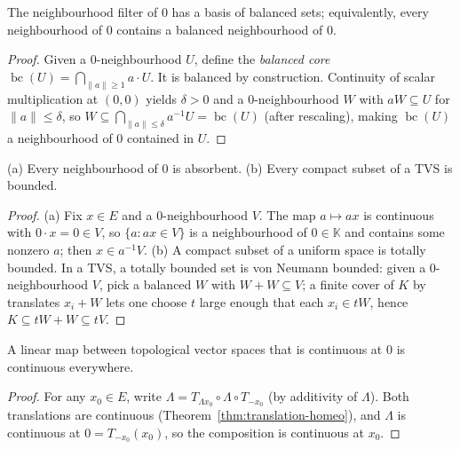 \begin{theorem}
  \label{thm:balanced-nhd}
  \leanok
  The neighbourhood filter of $0$ has a basis of balanced sets;
  equivalently, every neighbourhood of $0$ contains a balanced
  neighbourhood of $0$.
\end{theorem}
\begin{proof}
  \leanok
  Given a $0$-neighbourhood $U$, define the \emph{balanced core}
  $\operatorname{bc}(U) = \bigcap_{\|a\| \ge 1} a \cdot U$. It is
  balanced by construction. Continuity of scalar multiplication at
  $(0, 0)$ yields $\delta > 0$ and a $0$-neighbourhood $W$ with $a W
  \subseteq U$ for $\|a\| \le \delta$, so $W \subseteq \bigcap_{\|a\|
  \le \delta} a^{-1} U = \operatorname{bc}(U)$ (after rescaling), making
  $\operatorname{bc}(U)$ a neighbourhood of $0$ contained in $U$.
\end{proof}

\begin{theorem}
  \label{thm:absorbent-compact-bounded}
  \leanok
  (a) Every neighbourhood of $0$ is absorbent. (b) Every compact subset
  of a TVS is bounded.
\end{theorem}
\begin{proof}
  \leanok
  (a) Fix $x \in E$ and a $0$-neighbourhood $V$. The map $a \mapsto a x$
  is continuous with $0 \cdot x = 0 \in V$, so $\{a : a x \in V\}$ is a
  neighbourhood of $0 \in \mathbb{K}$ and contains some nonzero $a$;
  then $x \in a^{-1} V$.
  (b) A compact subset of a uniform space is totally bounded. In a TVS,
  a totally bounded set is von Neumann bounded: given a $0$-neighbourhood
  $V$, pick a balanced $W$ with $W + W \subseteq V$; a finite cover of
  $K$ by translates $x_i + W$ lets one choose $t$ large enough that each
  $x_i \in t W$, hence $K \subseteq t W + W \subseteq t V$.
\end{proof}

\begin{theorem}
  \label{thm:linear-cont-at-zero}
  \leanok
  A linear map between topological vector spaces that is continuous at
  $0$ is continuous everywhere.
\end{theorem}
\begin{proof}
  \leanok
  For any $x_0 \in E$, write $\Lambda = T_{\Lambda x_0} \circ \Lambda
  \circ T_{-x_0}$ (by additivity of $\Lambda$). Both translations are
  continuous (Theorem~\ref{thm:translation-homeo}), and $\Lambda$ is
  continuous at $0 = T_{-x_0}(x_0)$, so the composition is continuous at
  $x_0$.
\end{proof}

